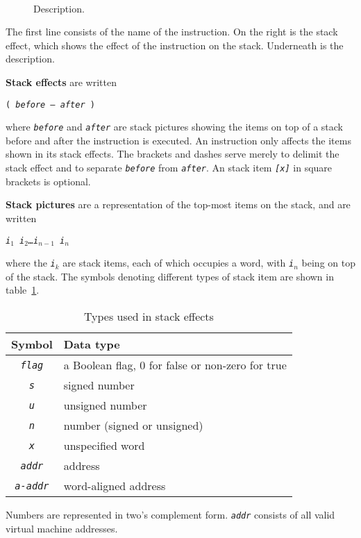 \documentclass[a4paper]{article}
\newcommand{\spic}[1]{\texttt{\textsl{#1\/}}}
\newlength{\itemwidth}\itemwidth=\textwidth \advance\itemwidth by -0.1in
\newlength{\instname}\instname=0.4in
\newlength{\opcodewidth}\opcodewidth=0.3in
\newlength{\stackcom}\stackcom=3.8in
\newcommand{\inst}[3]{\item[]\parbox{\itemwidth}%
{\makebox[\instname][l]{\tt #1}\makebox[\opcodewidth]{}%
\makebox[\stackcom][r]{\spic{#2}}\\[0.5ex]#3}}
\begin{document}
\begin{description}
\inst{NAME}{before — after}{Description.}
\end{description}

The first line consists of the name of the instruction. On the right is the
stack effect, which shows the effect of the instruction on the stack.
Underneath is the description.

{\bf Stack effects} are written

\centerline{\tt ( \spic{before — after} )}

\noindent where \spic{before} and \spic{after} are stack pictures showing the items on top
of a stack before and after the instruction is executed.
An instruction only affects the items shown in its
stack effects. The brackets and dashes serve merely to delimit the stack
effect and to separate \spic{before} from \spic{after}.
An stack item \spic{[x]} in square brackets is optional.

{\bf Stack pictures}
are a representation of the top-most items on the stack, and are written

\centerline{\spic{i$_1$ i$_2$\dots i$_{n-1}$ i$_n$}}

\noindent where the \spic{i$_k$} are stack items, each of which occupies a word, with \spic{i$_n$} being on top of the stack. The symbols denoting different types of stack item are shown in table~\ref{typetable}.

\begin{table}[htbp]
\begin{center}
\begin{tabular}{cl} \toprule
\bf Symbol & \bf Data type \\ \midrule
\spic{flag} & a Boolean flag, $0$ for false or non-zero for true \\
\spic{s} & signed number \\
\spic{u} & unsigned number \\
\spic{n} & number (signed or unsigned) \\
\spic{x} & unspecified word \\
\spic{addr} & address \\
\spic{a-addr} & word-aligned address \\
\bottomrule
\end{tabular}
\caption{\label{typetable}Types used in stack effects}
\end{center}
\end{table}

Numbers are represented in two's complement form. \spic{addr} consists of all
valid virtual machine addresses.
\end{document}
